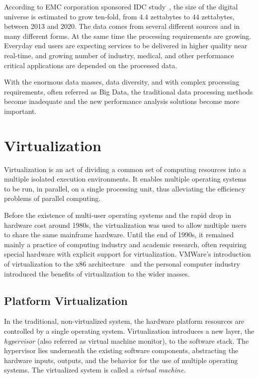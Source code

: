 According to EMC corporation sponsored IDC study~\cite{Turner:2014:Digital}, the size of the digital universe is estimated to grow ten-fold, from 4.4 zettabytes to 44 zettabytes, between 2013 and 2020. The data comes from several different sources and in many different forms. At the same time the processing requirements are growing. Everyday end users are expecting services to be delivered in higher quality near real-time, and growing number of industry, medical, and other performance critical applications are depended on the processed data.

With the enormous data masses, data diversity, and with complex processing requirements, often referred as Big Data, the traditional data processing methods become inadequate and the new performance analysis solutions become more important.


\section{Virtualization}
\label{section:virtualization}
Virtualization is an act of dividing a common set of computing resources into a multiple isolated execution environments. It enables multiple operating systems to be run, in parallel, on a single processing unit, thus alleviating the efficiency problems of parallel computing.

Before the existence of multi-user operating systems and the rapid drop in hardware cost around 1980s, the virtualization was used to allow multiple users to share the same mainframe hardware. Until the end of 1990s, it remained mainly a practice of computing industry and academic research, often requiring special hardware with explicit support for virtualization. VMWare's introduction of virtualization to the x86 architecture~\cite{Walters:1999:VVP} and the personal computer industry introduced the benefits of virtualization to the wider masses.~\cite{Bugnion:2012:BVX, Barham:2003:XAV}

\subsection{Platform Virtualization}
In the traditional, non-virtualized system, the hardware platform resources are controlled by a single operating system. Virtualization introduces a new layer, the \emph{hypervisor} (also referred as virtual machine monitor), to the software stack. The hypervisor lies underneath the existing software components, abstracting the hardware inputs, outputs, and the behavior for the use of multiple operating systems. The virtualized system is called a \emph{virtual machine}.~\cite{Uhlig:2005:IVT, Bugnion:2012:BVX, Barham:2003:XAV}

